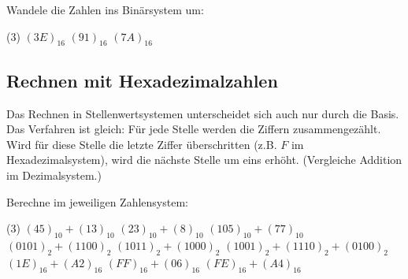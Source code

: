 \documentclass[9pt, a4paper]{arbeitsblatt}
\begin{document}
\begin{aufgabe}
	Wandele die Zahlen ins Binärsystem um:
	\begin{tasks}(3)
		\task $(3E)_{16}$ \task $(91)_{16}$ \task $(7A)_{16}$
	\end{tasks}
\end{aufgabe}

\subsection*{Rechnen mit Hexadezimalzahlen}
Das Rechnen in Stellenwertsystemen unterscheidet sich auch nur durch die Basis.
Das Verfahren ist gleich: Für jede Stelle werden die Ziffern zusammengezählt.
Wird für diese Stelle die letzte Ziffer überschritten (z.B.
$F$ im Hexadezimalsystem), wird die nächste Stelle um eins
erhöht. (Vergleiche Addition im Dezimalsystem.)

\begin{aufgabe}
	Berechne im jeweiligen Zahlensystem:
	\begin{tasks}(3)
		\task $(45)_{10} +
				(13)_{10}$ \task $(23)_{10} +
				(8)_{10}$ \task $(105)_{10} +
				(77)_{10}$
		\task $(0101)_{2} +
				(1100)_{2}$ \task $(1011)_{2} +
				(1000)_{2}$ \task $(1001)_{2} +
				(1110)_{2} +
				(0100)_{2}$
		\task $(1E)_{16} +
				(A2)_{16}$ \task $(FF)_{16} +
				(06)_{16}$ \task $(FE)_{16} +
				(A4)_{16}$
	\end{tasks}
\end{aufgabe}
\end{document}
